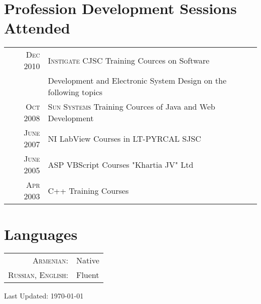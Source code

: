 \documentclass[a4paper,10pt]{article}
\begin{document}
\section{Profession Development Sessions Attended}
\begin{tabular}{rl}
  \textsc{Dec} 2010
    & \textsc{Instigate CJSC} Training Cources on Software \\
    & Development and Electronic System Design on the following topics \\
  \textsc{Oct} 2008
    & \textsc{Sun Systems} Training Cources of Java and Web Development \\
  \textsc{June} 2007
    & NI LabView Courses in LT-PYRCAL SJSC \\
  \textsc{June} 2005
    & ASP VBScript Courses "Khartia JV" Ltd \\
  \textsc{Apr} 2003
    & C++ Training Courses
\end{tabular}


\section{Languages}
\begin{tabular}{rl}
  \textsc{Armenian:}         & Native \\
  \textsc{Russian, English:} & Fluent \\
\end{tabular}


\vfill
\hfill \footnotesize{Last Updated: \mydate\today }
\end{document}
